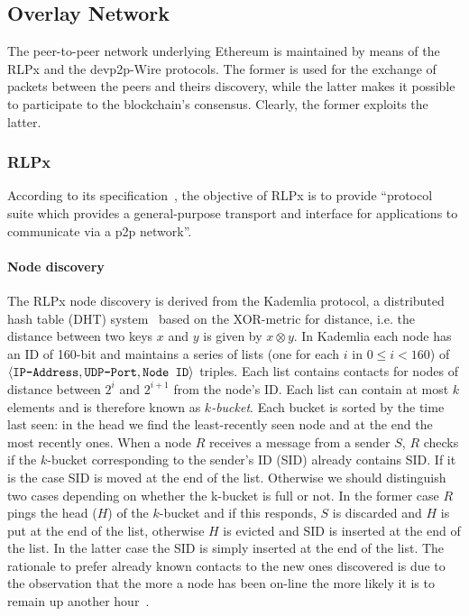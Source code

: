 \subsection{Overlay Network}
\label{sec:overlay-network}
The peer-to-peer network underlying Ethereum is maintained by means of the
RLPx and the devp2p-Wire protocols.
The former is used for the exchange of packets between the peers and theirs
discovery, while the latter makes it possible to participate to the
blockchain's consensus. Clearly, the former exploits the latter.

\subsubsection{RLPx}
According to its specification~\cite{}, the objective of RLPx is to
provide ``protocol suite which
provides a general-purpose transport and interface for applications to
communicate via a p2p network''.

\paragraph{Node discovery}
The RLPx node discovery is derived from the Kademlia protocol,
a distributed hash table (DHT) system~\cite{bib:kademlia}
based on the XOR-metric for
distance, i.e. the distance between two keys $x$ and $y$ is given
by $x \otimes y$.
In Kademlia each node has an ID of 160-bit and maintains a
series of lists (one for each $i$ in $0 \leq i < 160$) of
$\langle \verb|IP-Address|, \verb|UDP-Port|, \verb|Node ID| \rangle$ triples.
Each list contains contacts for nodes of distance between $2^i$ and $2^{i+1}$
from the node's ID.
Each list can contain at most $k$ elements and is therefore known as
\textit{$k$-bucket}.
Each bucket is sorted by the time last
seen: in the head we find the least-recently seen node and at the end the most
recently ones.
When a node $R$ receives a message from a sender $S$, $R$ checks if the
$k$-bucket corresponding to the sender's ID (SID) already contains SID.
If it is the case SID is moved at the end of the list. Otherwise we should
distinguish two cases depending on whether the k-bucket is full or not.
In the former case $R$ pings the head ($H$) of the $k$-bucket and if
this responds, $S$ is discarded and $H$ is put at the end of the list,
otherwise $H$ is evicted and SID is inserted at the end of the list.
In the latter case the SID is simply inserted at the end of the list.
The rationale to prefer already known contacts to the new ones discovered
is due to the observation that the more a node has been on-line the more
likely it is to remain up another hour~\cite{bib:kademlia}.

